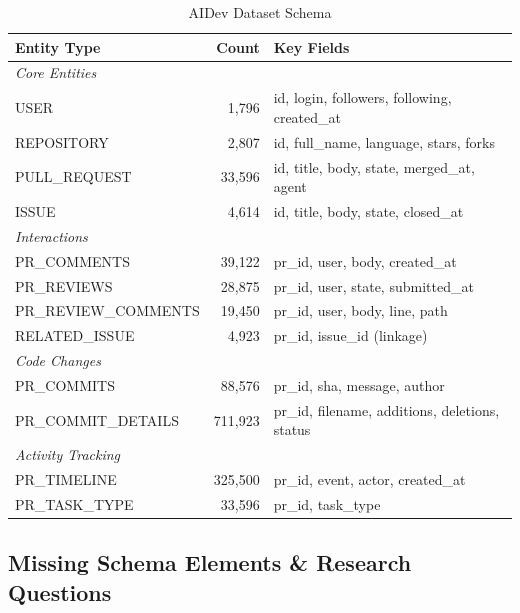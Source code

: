 \documentclass[11pt]{article}
\begin{document}
\begin{table}[H]
\centering
\caption{AIDev Dataset Schema}
\small
\begin{tabular}{@{}lrl@{}}
\toprule
\textbf{Entity Type} & \textbf{Count} & \textbf{Key Fields} \\
\midrule
\multicolumn{3}{l}{\textit{Core Entities}} \\
USER & 1,796 & id, login, followers, following, created\_at \\
REPOSITORY & 2,807 & id, full\_name, language, stars, forks \\
PULL\_REQUEST & 33,596 & id, title, body, state, merged\_at, agent \\
ISSUE & 4,614 & id, title, body, state, closed\_at \\
\midrule
\multicolumn{3}{l}{\textit{Interactions}} \\
PR\_COMMENTS & 39,122 & pr\_id, user, body, created\_at \\
PR\_REVIEWS & 28,875 & pr\_id, user, state, submitted\_at \\
PR\_REVIEW\_COMMENTS & 19,450 & pr\_id, user, body, line, path \\
RELATED\_ISSUE & 4,923 & pr\_id, issue\_id (linkage) \\
\midrule
\multicolumn{3}{l}{\textit{Code Changes}} \\
PR\_COMMITS & 88,576 & pr\_id, sha, message, author \\
PR\_COMMIT\_DETAILS & 711,923 & pr\_id, filename, additions, deletions, status \\
\midrule
\multicolumn{3}{l}{\textit{Activity Tracking}} \\
PR\_TIMELINE & 325,500 & pr\_id, event, actor, created\_at \\
PR\_TASK\_TYPE & 33,596 & pr\_id, task\_type \\
\bottomrule
\end{tabular}
\end{table}

\subsection{Missing Schema Elements \& Research Questions}
\end{document}
